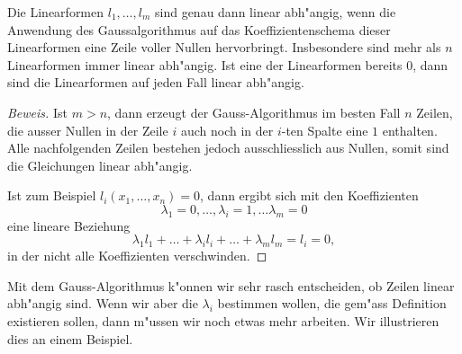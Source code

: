 \begin{hilfssatz}
Die Linearformen $l_1,\dots,l_m$ sind genau dann linear abh"angig, wenn
die Anwendung des Gaussalgorithmus auf das Koeffizientenschema dieser
Linearformen eine Zeile voller Nullen hervorbringt.
Insbesondere sind mehr als $n$ Linearformen immer linear abh"angig.
Ist eine der Linearformen
bereits $0$, dann sind die Linearformen auf jeden Fall linear abh"angig.
\end{hilfssatz}

\begin{proof}[Beweis]
Ist $m>n$, dann erzeugt der Gauss-Algorithmus im besten Fall $n$ Zeilen,
die ausser Nullen in der Zeile $i$ auch noch in der $i$-ten Spalte eine
$1$ enthalten.
Alle nachfolgenden Zeilen bestehen jedoch ausschliesslich
aus Nullen, somit sind die Gleichungen linear abh"angig.

Ist zum Beispiel $l_i(x_1,\dots,x_n)=0$, dann ergibt sich mit den
Koeffizienten
\[
\lambda_1=0,\dots,\lambda_i=1,\dots \lambda_m=0
\]
eine lineare Beziehung
\[
\lambda_1l_1+\dots+\lambda_il_i+\dots+\lambda_ml_m=l_i=0,
\]
in der nicht alle Koeffizienten verschwinden.
\end{proof}

Mit dem Gauss-Algorithmus k"onnen wir sehr rasch entscheiden, ob Zeilen 
linear abh"angig sind.
Wenn wir aber die $\lambda_i$ bestimmen wollen,
die gem"ass Definition existieren sollen, dann m"ussen wir noch etwas
mehr arbeiten.
Wir illustrieren dies an einem Beispiel.

